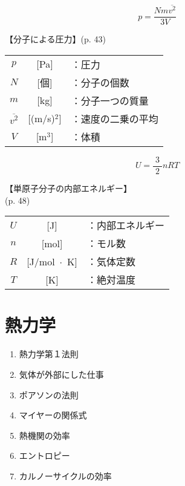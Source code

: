 \documentclass[10pt]{jarticle}
\begin{document}
\newpage
\[
	p = \frac{N m \overline{v^2}}{3V}
\]


\vskip3mm
【分子による圧力】{\footnotesize (p. 43)}

\begin{tabular}{ccl}
$p$	&[Pa]	&：圧力\\
$N$	&[個]	&：分子の個数\\
$m$	&[kg]	&：分子一つの質量\\
$\overline{v^2}$	&[(m/s)$^2$]	&：{\small 速度の二乗の平均}\\
$V$	&[m$^3$]	&：体積
\end{tabular}






\newpage
\[
	U = \frac{3}{\; 2 \;} n RT
\]


\vskip3mm
【単原子分子の内部エネルギー】\\
\hfill {\footnotesize (p. 48)}

\begin{tabular}{ccl}
$U$	&[J]	&：内部エネルギー\\
$n$	&[mol]	&：モル数\\
$R$	&[J/mol $\!\! \cdot \!\! $ K]	&：気体定数\\
$T$	&[K]	&：絶対温度
\end{tabular}




\newpage
\addtocounter{page}{-1}
\thispagestyle{empty}
\section{熱力学}


\begin{enumerate}
\setcounter{enumi}{\thepage}
\small
\itemsep-4mm
\item 熱力学第１法則\\
\item 気体が外部にした仕事\\
\item ポアソンの法則\\
\item マイヤーの関係式\\
\item 熱機関の効率\\
\item エントロピー\\
\item カルノーサイクルの効率
\end{enumerate}
\end{document}

